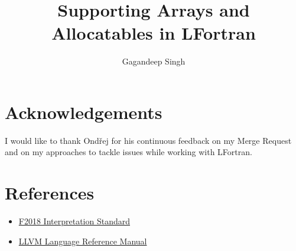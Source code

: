 \documentclass[12pt]{extarticle}
\title{Supporting Arrays and Allocatables in LFortran}
\author{Gagandeep Singh}
\begin{document}
\maketitle

\tableofcontents





\section{Acknowledgements}

I would like to thank Ondřej for his continuous feedback on my Merge Request and on my approaches to tackle issues while working with LFortran.

\section{References}

\begin{itemize}

\item \href{https://j3-fortran.org/doc/year/18/18-007r1.pdf}{F2018 Interpretation Standard}

\item \href{https://llvm.org/docs/LangRef.html}{LLVM Language Reference Manual}

\end{itemize}



\end{document}
